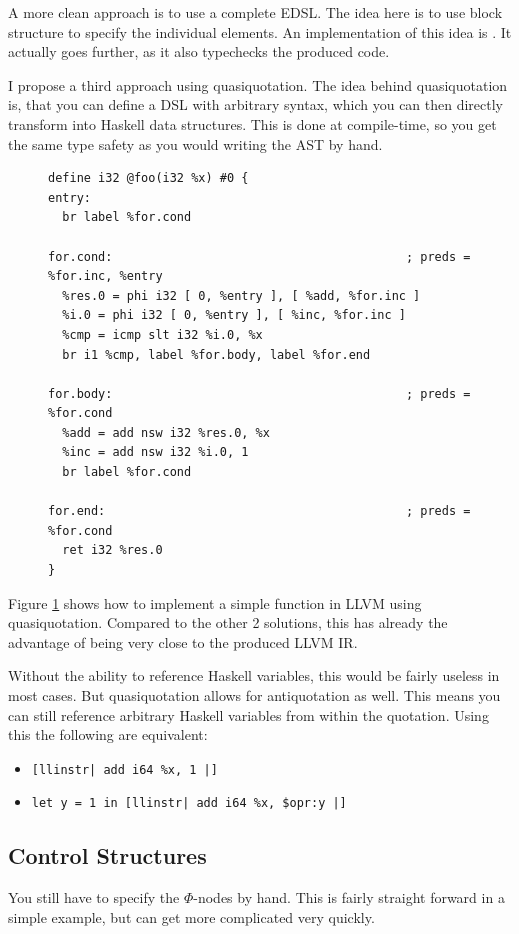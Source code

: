 \documentclass[a4paper,bibliography=totocnumbered,parskip,headsepline]{scrbook}
\begin{document}
A more clean approach is to use a complete EDSL.
The idea here is to use block structure to specify the individual elements.
An implementation of this idea is .
It actually goes further, as it also typechecks the produced code.

I propose a third approach using quasiquotation\cite{mainland2007quote}.
The idea behind quasiquotation is, that you can define a DSL with arbitrary syntax, which you can then directly transform into Haskell data structures.
This is done at compile-time, so you get the same type safety as you would writing the AST by hand.

\begin{figure}
\begin{lstlisting}
define i32 @foo(i32 %x) #0 {
entry:
  br label %for.cond

for.cond:                                         ; preds = %for.inc, %entry
  %res.0 = phi i32 [ 0, %entry ], [ %add, %for.inc ]
  %i.0 = phi i32 [ 0, %entry ], [ %inc, %for.inc ]
  %cmp = icmp slt i32 %i.0, %x
  br i1 %cmp, label %for.body, label %for.end

for.body:                                         ; preds = %for.cond
  %add = add nsw i32 %res.0, %x
  %inc = add nsw i32 %i.0, 1
  br label %for.cond

for.end:                                          ; preds = %for.cond
  ret i32 %res.0
}
\end{lstlisting}
\label{fig:simplequote}
\end{figure}

Figure \ref{fig:simplequote} shows how to implement a simple function in LLVM using quasiquotation.
Compared to the other 2 solutions, this has already the advantage of being very close to the produced LLVM IR.

Without the ability to reference Haskell variables, this would be fairly useless in most cases.
But quasiquotation allows for antiquotation as well.
This means you can still reference arbitrary Haskell variables from within the quotation.
Using this the following are equivalent:
\begin{itemize}
 \item \lstinline{[llinstr| add i64 %x, 1 |]}
 \item \lstinline{let y = 1 in [llinstr| add i64 %x, $opr:y |]}
\end{itemize}

\subsection{Control Structures}
You still have to specify the $\Phi$-nodes by hand.
This is fairly straight forward in a simple example, but can get more complicated very quickly.
\end{document}
